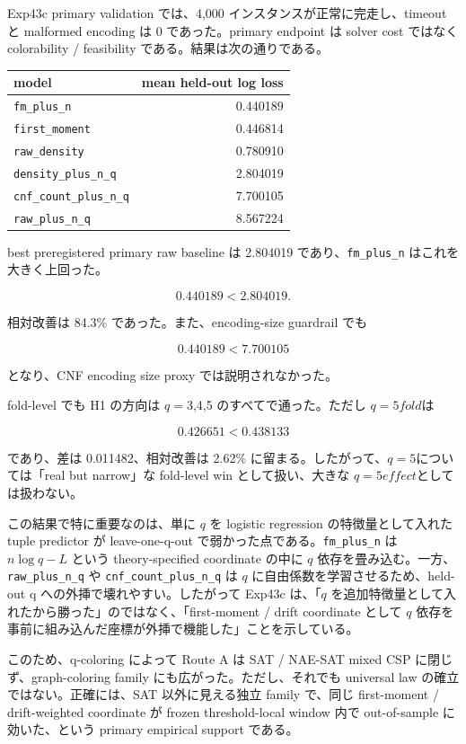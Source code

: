\documentclass[12pt,a4paper]{article}
\begin{document}
Exp43c primary validation では、4,000 インスタンスが正常に完走し、timeout と malformed encoding は 0 であった。primary endpoint は solver cost ではなく colorability / feasibility である。結果は次の通りである。

{\def\LTcaptype{table} %
\begin{longtable}[]{@{}lr@{}}
\toprule\noalign{}
model & mean held-out log loss \\
\midrule\noalign{}
\endhead
\bottomrule\noalign{}
\endlastfoot
\texttt{fm\_plus\_n} & 0.440189 \\
\texttt{first\_moment} & 0.446814 \\
\texttt{raw\_density} & 0.780910 \\
\texttt{density\_plus\_n\_q} & 2.804019 \\
\texttt{cnf\_count\_plus\_n\_q} & 7.700105 \\
\texttt{raw\_plus\_n\_q} & 8.567224 \\
\end{longtable}
}

best preregistered primary raw baseline は 2.804019 であり、\texttt{fm\_plus\_n} はこれを大きく上回った。

\[
0.440189 < 2.804019.
\]

相対改善は 84.3\% であった。また、encoding-size guardrail でも

\[
0.440189 < 7.700105
\]

となり、CNF encoding size proxy では説明されなかった。

fold-level でも H1 の方向は \(q=3\),4,5 のすべてで通った。ただし \(q=5 fold\)は

\[
0.426651 < 0.438133
\]

であり、差は 0.011482、相対改善は 2.62\% に留まる。したがって、\(q=5\)については「real but narrow」な fold-level win として扱い、大きな \(q=5 effect\)としては扱わない。

この結果で特に重要なのは、単に \(q\) を logistic regression の特徴量として入れた tuple predictor が leave-one-q-out で弱かった点である。\texttt{fm\_plus\_n} は \(n\log q-L\) という theory-specified coordinate の中に \(q\) 依存を畳み込む。一方、\texttt{raw\_plus\_n\_q} や \texttt{cnf\_count\_plus\_n\_q} は \(q\) に自由係数を学習させるため、held-out q への外挿で壊れやすい。したがって Exp43c は、「\(q\) を追加特徴量として入れたから勝った」のではなく、「first-moment / drift coordinate として \(q\) 依存を事前に組み込んだ座標が外挿で機能した」ことを示している。

このため、q-coloring によって Route A は SAT / NAE-SAT mixed CSP に閉じず、graph-coloring family にも広がった。ただし、それでも universal law の確立ではない。正確には、SAT 以外に見える独立 family で、同じ first-moment / drift-weighted coordinate が frozen threshold-local window 内で out-of-sample に効いた、という primary empirical support である。
\end{document}
